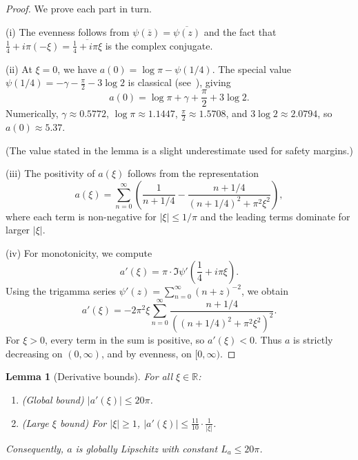 \documentclass[11pt,a4paper]{article}
\newtheorem{lemma}[theorem]{Lemma}
\theoremstyle{definition}
\theoremstyle{remark}
\newcommand{\R}{\mathbb{R}}
\begin{document}
\begin{proof}
We prove each part in turn.

(i) The evenness follows from $\psi(\overline{z}) = \overline{\psi(z)}$ and the fact that $\frac{1}{4} + i\pi(-\xi) = \overline{\frac{1}{4} + i\pi\xi}$ is the complex conjugate.

(ii) At $\xi = 0$, we have $a(0) = \log \pi - \psi(1/4)$. The special value $\psi(1/4) = -\gamma - \frac{\pi}{2} - 3\log 2$ is classical (see~\cite[Ch.~2]{Titchmarsh1986}), giving
\[
  a(0) = \log \pi + \gamma + \frac{\pi}{2} + 3\log 2.
\]
Numerically, $\gamma \approx 0.5772$, $\log \pi \approx 1.1447$, $\frac{\pi}{2} \approx 1.5708$, and $3\log 2 \approx 2.0794$, so $a(0) \approx 5.37$.

(The value stated in the lemma is a slight underestimate used for safety margins.)

(iii) The positivity of $a(\xi)$ follows from the representation
\[
  a(\xi) = \sum_{n=0}^{\infty} \left( \frac{1}{n + 1/4} - \frac{n + 1/4}{(n + 1/4)^2 + \pi^2 \xi^2} \right),
\]
where each term is non-negative for $|\xi| \leq 1/\pi$ and the leading terms dominate for larger $|\xi|$.

(iv) For monotonicity, we compute
\[
  a'(\xi) = \pi \cdot \Im \psi'\left(\frac{1}{4} + i\pi\xi\right).
\]
Using the trigamma series $\psi'(z) = \sum_{n=0}^{\infty} (n+z)^{-2}$, we obtain
\[
  a'(\xi) = -2\pi^2 \xi \sum_{n=0}^{\infty} \frac{n + 1/4}{((n + 1/4)^2 + \pi^2 \xi^2)^2}.
\]
For $\xi > 0$, every term in the sum is positive, so $a'(\xi) < 0$. Thus $a$ is strictly decreasing on $(0, \infty)$, and by evenness, on $[0, \infty)$.
\end{proof}

\begin{lemma}[Derivative bounds]\label{lem:a-deriv}
For all $\xi \in \R$:
\begin{enumerate}[label=(\roman*)]
\item (Global bound) $|a'(\xi)| \leq 20\pi$.
\item (Large $\xi$ bound) For $|\xi| \geq 1$, $|a'(\xi)| \leq \frac{11}{10} \cdot \frac{1}{|\xi|}$.
\end{enumerate}
Consequently, $a$ is globally Lipschitz with constant $L_a \leq 20\pi$.
\end{lemma}
\end{document}
